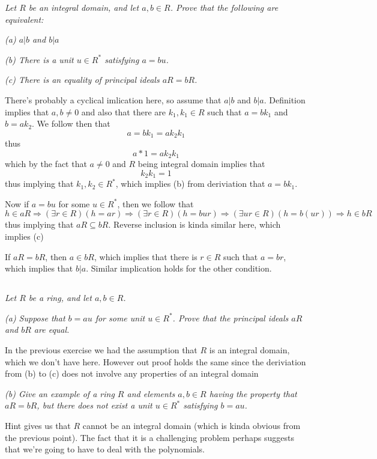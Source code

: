 \documentclass[11pt,oneside,titlepage]{book}
\DeclareMathOperator \ra {\Rightarrow}
\begin{document}
\textit{Let $R$ be an integral domain, and let $a, b \in R$. Prove
  that the following are equivalent:}

\textit{(a) $a | b$ and $b | a$ }

\textit{(b) There is a unit $u \in R^*$ satisfying $a = bu$. }

\textit{(c) There is an equality of principal ideals $aR = bR$.}

There's probably a cyclical imlication here, so assume that $a | b$ and $b | a$.
Definition implies that $a, b \neq 0$ and also that there are $k_1,
k_1 \in R$ such that $a = bk_1$ and $b = a k_2$. We follow then that
$$a = bk_1 = a k_2 k_1$$
thus
$$a * 1 = a k_2 k_1$$
which by the fact that $a \neq 0$ and $R$ being integral domain implies that
$$k_2 k_1 = 1$$
thus implying that $k_1, k_2 \in R^*$, which implies (b) from deriviation that
$a = bk_1$.

Now if $a = bu$ for some $u \in R^*$, then we follow that
$$h \in aR \ra (\exists r \in R)( h = ar) \ra
(\exists r \in R)( h = bur) \ra  (\exists ur \in R)( h = b(ur)) \ra h \in bR$$
thus implying that $aR \subseteq bR$. Reverse inclusion is kinda similar here,
which implies (c)

If $aR = bR$, then $a \in bR$, which implies that there is $r \in R$ such
that $a = br$, which implies that $b | a$. Similar implication holds
for the other condition.

\subsection{}

\textit{Let $R$ be a ring, and let $a, b \in R$. }

\textit{(a) Suppose that $b = au$ for some unit $u \in R^*$. Prove
that the principal ideals $aR$ and $bR$ are equal.}

In the previous exercise we had the assumption that $R$ is an integral
domain, which we don't have here. However out proof holds the same
since the deriviation from (b) to (c) does not involve any properties
of an integral domain

\textit{(b) Give an example of a ring $R$ and elements $a, b \in R$
  having the property that $aR = bR$, but there does not exist a unit
  $u \in R^*$ satisfying $b = au$.}

Hint gives us that $R$ cannot be an integral domain (which is kinda
obvious from the previous point). The fact that it is a challenging
problem perhaps suggests that we're going to have to deal with the
polynomials. 
\end{document}
